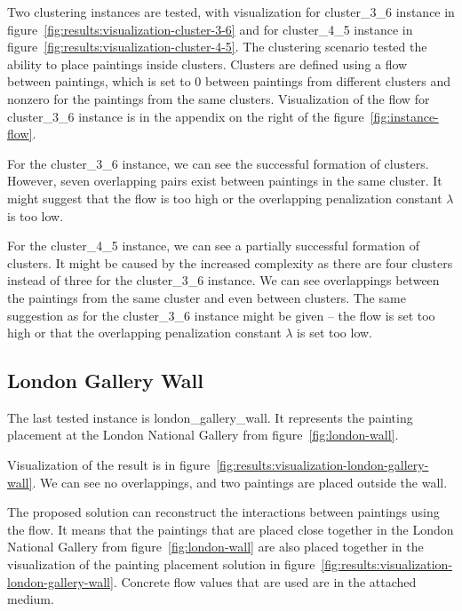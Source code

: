 Two clustering instances are tested, with visualization for cluster\_3\_6 instance
in figure~\ref{fig:results:visualization-cluster-3-6} and for cluster\_4\_5 instance in figure~\ref{fig:results:visualization-cluster-4-5}.
The clustering scenario tested the ability to place paintings inside clusters.
Clusters are defined using a flow between paintings, which is set to 0 between paintings from different
clusters and nonzero for the paintings from the same clusters.
Visualization of the flow for cluster\_3\_6 instance is in the appendix on the right of the figure~\ref{fig:instance-flow}.

For the cluster\_3\_6 instance, we can see the successful formation of clusters.
However, seven overlapping pairs exist between paintings in the same cluster.
It might suggest that the flow is too high or the overlapping penalization constant $\lambda$ is too low.


For the cluster\_4\_5 instance, we can see a partially successful formation of clusters.
It might be caused by the increased complexity as there are four clusters instead of three for the cluster\_3\_6 instance.
We can see overlappings between the paintings from the same cluster and even between clusters.
The same suggestion as for the cluster\_3\_6 instance might be given – the flow is set too high or that the overlapping penalization constant $\lambda$ is set too low.

\subsection{London Gallery Wall}\label{subsec:london-gallery-wall}

The last tested instance is london\_gallery\_wall.
It represents the painting placement at the London National Gallery from figure~\ref{fig:london-wall}.

Visualization of the result is in figure~\ref{fig:results:visualization-london-gallery-wall}.
We can see no overlappings, and two paintings are placed outside the wall.

The proposed solution can reconstruct the interactions between paintings using the flow.
It means that the paintings that are placed close together in the London National Gallery from figure~\ref{fig:london-wall}
are also placed together in the visualization of the painting placement solution in figure~\ref{fig:results:visualization-london-gallery-wall}.
Concrete flow values that are used are in the attached medium.


\clearpage
\newpage

